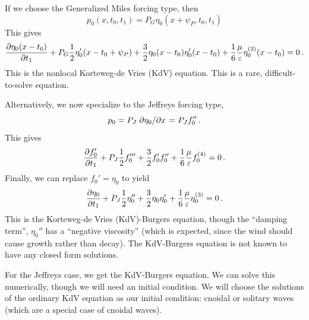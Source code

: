 \documentclass{jfm}
\renewcommand*{\epsilon}{\varepsilon}
\begin{document}
If we choose the Generalized Miles forcing type, then
\[
  p_0(x,t_0,t_1) = P_G \eta_0(x+\psi_P,t_0,t_1)
\]
This gives
\begin{equation}
  \pdv{\eta_0(x-t_0)}{t_1} + P_G \frac{1}{2} \eta_0'(x-t_0+\psi_P) +
  \frac{3}{2} \eta_0(x-t_0) \eta_0'(x-t_0) + \frac{1}{6}
  \frac{\mu}{\epsilon} \eta_0^{(3)}(x-t_0) = 0 \,.
  \label{eq:kdv_burgers_gen}
\end{equation}
This is the nonlocal Korteweg-de Vries (KdV) equation.
This is a rare, difficult-to-solve equation.

Alternatively, we now specialize to the Jeffreys forcing type,
\begin{equation}
  p_0 = P_J \pdv*{\eta_0}{x} = P_J f_0'' \,.
\end{equation}
This gives
\begin{equation}
   \pdv{f_0'}{t_1} + P_J \frac{1}{2} f_0''' + \frac{3}{2} f_0' f_0'' +
   \frac{1}{6} \frac{\mu}{\epsilon} f_0^{(4)} = 0 \,.
\end{equation}
Finally, we can replace $f_0' = \eta_0$ to yield
\begin{equation}
   \pdv{\eta_0}{t_1} + P_J \frac{1}{2} \eta_0'' + \frac{3}{2} \eta_0
   \eta_0' + \frac{1}{6} \frac{\mu}{\epsilon} \eta_0^{(3)} = 0 \,.
  \label{eq:kdv_burgers}
\end{equation}
This is the Korteweg-de Vries (KdV)-Burgers equation, though the
``damping term'', $\eta_0''$ has a ``negative viscosity'' (which is
expected, since the wind should cause growth rather than decay).
The KdV-Burgers equation is not known to have any closed form solutions.

For the Jeffreys case, we get the KdV-Burgers equation.
We can solve this numerically, though we will need an initial condition.
We will choose the solutions of the ordinary KdV equation as our initial
condition: cnoidal or solitary waves (which are a special case of
cnoidal waves).
\end{document}
